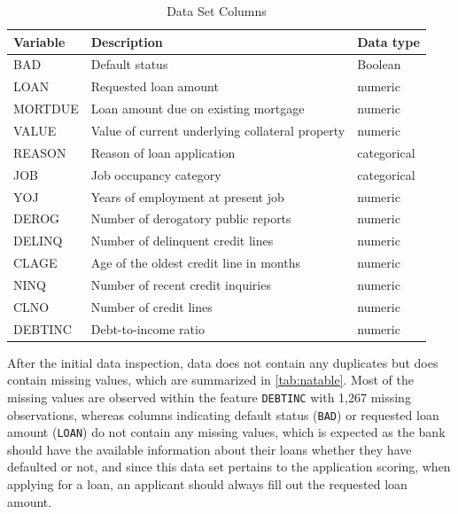 \begin{table}[H]
\small
\setlength{\tabcolsep}{8pt}
\renewcommand{\arraystretch}{1.3}
\centering
\caption[Data Set Columns]{Data Set Columns}\label{tab:dataset}
\begin{tabular}{@{} l p{8cm} l @{}}
\toprule
\textbf{Variable} & \textbf{Description} & \textbf{Data type}\\
\midrule
\hline
BAD & Default status & Boolean \\

LOAN & Requested loan amount & numeric \\

MORTDUE & Loan amount due on existing mortgage & numeric \\

VALUE & Value of current underlying collateral property & numeric \\

REASON & Reason of loan application & categorical \\
JOB & Job occupancy category & categorical \\

YOJ & Years of employment at present job & numeric \\

DEROG & Number of derogatory public reports & numeric \\

DELINQ & Number of delinquent credit lines & numeric \\

CLAGE & Age of the oldest credit line in months & numeric \\

NINQ & Number of recent credit inquiries & numeric \\

CLNO & Number of credit lines & numeric \\

DEBTINC & Debt-to-income ratio & numeric \\
\hline
\bottomrule
\end{tabular}
\vspace{0.35em}

\vspace{-1em}
\end{table}

After the initial data inspection, data does not contain any duplicates but does contain missing values, which are summarized in \autoref{tab:natable}.
Most of the missing values are observed within the feature \texttt{DEBTINC} with 1,267 missing observations,
whereas columns indicating default status (\texttt{BAD}) or requested loan amount (\texttt{LOAN}) do not contain any missing values, which is expected as the bank should have the available information about their loans whether they have defaulted or not, and since this data set pertains to the application scoring, when applying for a loan, an applicant should always fill out the requested loan amount.

